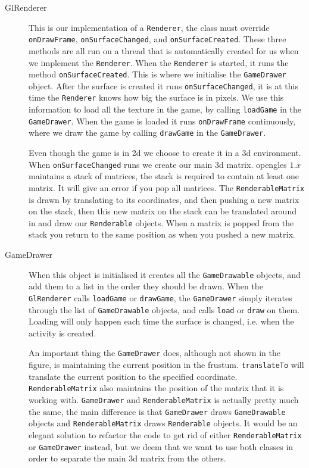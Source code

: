 \begin{description}

\item[GlRenderer] This is our implementation of a \lstinline|Renderer|, the class must override \lstinline|onDrawFrame|, \lstinline|onSurfaceChanged|, and \lstinline|onSurfaceCreated|. These three methods are all run on a thread that is automatically created for us when we implement the \lstinline|Renderer|. When the \lstinline|Renderer| is started, it runs the method \lstinline|onSurfaceCreated|. This is where we initialise the \lstinline|GameDrawer| object. After the surface is created it runs \lstinline|onSurfaceChanged|, it is at this time the \lstinline|Renderer| knows how big the surface is in pixels. We use this information to load all the texture in the game, by calling \lstinline|loadGame| in the \lstinline|GameDrawer|. When the game is loaded it runs \lstinline|onDrawFrame| continuously, where we draw the game by calling \lstinline|drawGame| in the \lstinline|GameDrawer|.

Even though the game is in \ac{2d} we choose to create it in a \ac{3d} environment. When \lstinline|onSurfaceChanged| runs we create our main \ac{3d} matrix. \ac{opengles} $1.x$ maintains a stack of matrices, the stack is required to contain at least one matrix. It will give an error if you pop all matrices. The \lstinline|RenderableMatrix| is drawn by translating to its coordinates, and then pushing a new matrix on the stack, then this new matrix on the stack can be translated around in and draw our \lstinline|Renderable| objects. When a matrix is popped from the stack you return to the same position as when you pushed a new matrix.\citep{openglspecs}

\item[GameDrawer] When this object is initialised it creates all the \lstinline|GameDrawable| objects, and add them to a list in the order they should be drawn. When the \lstinline|GlRenderer| calls \lstinline|loadGame| or \lstinline|drawGame|, the \lstinline|GameDrawer| simply iterates through the list of \lstinline|GameDrawable| objects, and calls \lstinline|load| or \lstinline|draw| on them. Loading will only happen each time the surface is changed, i.e. when the activity is created.

An important thing the \lstinline|GameDrawer| does, although not shown in the figure, is maintaining the current position in the frustum. \lstinline|translateTo| will translate the current position to the specified coordinate. \lstinline|RenderableMatrix| also maintains the position of the matrix that it is working with. \lstinline|GameDrawer| and \lstinline|RenderableMatrix| is actually pretty much the same, the main difference is that \lstinline|GameDrawer| draws \lstinline|GameDrawable| objects and \lstinline|RenderableMatrix| draws \lstinline|Renderable| objects. It would be an elegant solution to refactor the code to get rid of either \lstinline|RenderableMatrix| or \lstinline|GameDrawer| instead, but we deem that we want to use both classes in order to separate the main \ac{3d} matrix from the others.


\end{description}
